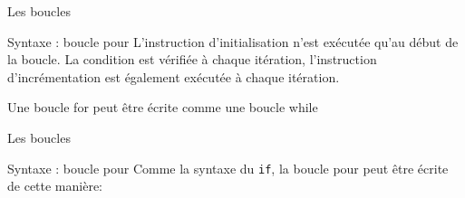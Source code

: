 \documentclass{beamer}
\begin{document}
\begin{darkframes}


	\begin{frame}{Les boucles}	
		\begin{block}{Syntaxe : boucle pour}
			\forsyntax
			L'instruction \alert{d'initialisation } n'est exécutée qu'au début de la boucle. La \alert{condition} est vérifiée à chaque itération, \alert{l'instruction d'incrémentation} est également exécutée à chaque itération.
		\end{block}
		\begin{alertblock}{Une boucle for peut être écrite comme une boucle while}
			\forWrittenUsingWhile
		\end{alertblock}
	\end{frame}



	\begin{frame}{Les boucles}
		\begin{block}{Syntaxe : boucle pour}
			Comme la syntaxe du \texttt{if}, la boucle pour peut être écrite de cette manière:
			\forsyntaxtwo
		\end{block}
		\begin{center}
			\begin{minipage}[t]{0.48\linewidth}
				\forExmpOne
			\end{minipage}
			\begin{minipage}[t]{0.48\linewidth}
				\forExmpTwo
			\end{minipage}
		\end{center}
	\end{frame}
	


\end{darkframes}
\end{document}
